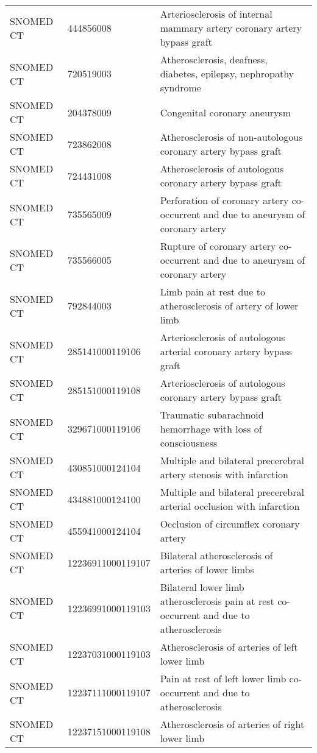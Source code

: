 \begin{longtable}{p{}p{}p{}}
  SNOMED CT & 444856008 & Arteriosclerosis of internal mammary artery coronary artery bypass graft \\ 
  SNOMED CT & 720519003 & Atherosclerosis, deafness, diabetes, epilepsy, nephropathy syndrome \\ 
  SNOMED CT & 204378009 & Congenital coronary aneurysm \\ 
  SNOMED CT & 723862008 & Atherosclerosis of non-autologous coronary artery bypass graft \\ 
  SNOMED CT & 724431008 & Atherosclerosis of autologous coronary artery bypass graft \\ 
  SNOMED CT & 735565009 & Perforation of coronary artery co-occurrent and due to aneurysm of coronary artery \\ 
  SNOMED CT & 735566005 & Rupture of coronary artery co-occurrent and due to aneurysm of coronary artery \\ 
  SNOMED CT & 792844003 & Limb pain at rest due to atherosclerosis of artery of lower limb \\ 
  SNOMED CT & 285141000119106 & Arteriosclerosis of autologous arterial coronary artery bypass graft \\ 
  SNOMED CT & 285151000119108 & Arteriosclerosis of autologous coronary artery bypass graft \\ 
  SNOMED CT & 329671000119106 & Traumatic subarachnoid hemorrhage with loss of consciousness \\ 
  SNOMED CT & 430851000124104 & Multiple and bilateral precerebral artery stenosis with infarction \\ 
  SNOMED CT & 434881000124100 & Multiple and bilateral precerebral arterial occlusion with infarction \\ 
  SNOMED CT & 455941000124104 & Occlusion of circumflex coronary artery \\ 
  SNOMED CT & 12236911000119107 & Bilateral atherosclerosis of arteries of lower limbs \\ 
  SNOMED CT & 12236991000119103 & Bilateral lower limb atherosclerosis pain at rest co-occurrent and due to atherosclerosis \\ 
  SNOMED CT & 12237031000119103 & Atherosclerosis of arteries of left lower limb \\ 
  SNOMED CT & 12237111000119107 & Pain at rest of left lower limb co-occurrent and due to atherosclerosis \\ 
  SNOMED CT & 12237151000119108 & Atherosclerosis of arteries of right lower limb \\ 

\end{longtable}

